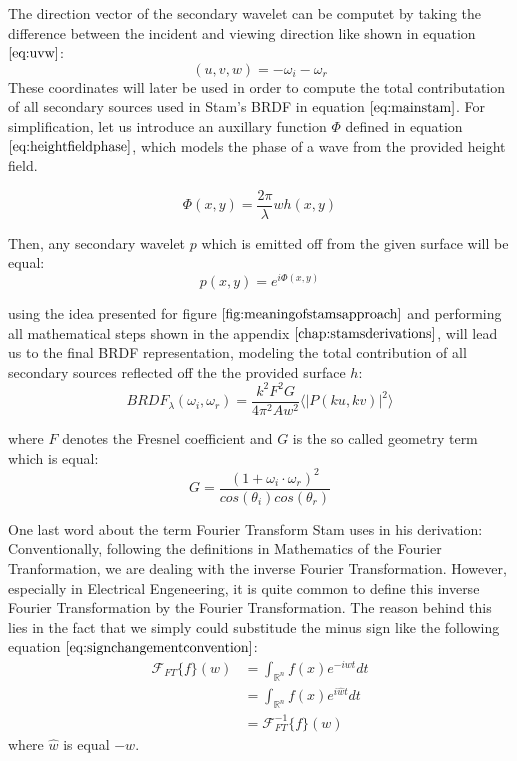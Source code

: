 The direction vector of the secondary wavelet can be computet by taking the difference between the incident and viewing direction like shown in equation $\ref{eq:uvw}$:
\begin{equation}
  (u,v,w) = -\omega_i - \omega_r 
\label{eq:uvw}
\end{equation}
These coordinates will later be used in order to compute the total contributation of all secondary sources used in Stam's BRDF in equation $\ref{eq:mainstam}$. For simplification, let us introduce an auxillary function $\Phi$ defined in equation $\ref{eq:heightfieldphase}$, which models the phase of a wave from the provided height field.

\begin{equation}
  \Phi(x,y) = \frac{2 \pi}{\lambda} w h(x,y) 
\label{eq:heightfieldphase}
\end{equation}

Then, any secondary wavelet $p$ which is emitted off from the given surface will be equal:
\begin{equation}
  p(x,y) = e^{i\Phi(x,y)} 
\label{eq:px}
\end{equation}

using the idea presented for figure $\ref{fig:meaningofstamsapproach}$ and performing all mathematical steps shown in the appendix $\ref{chap:stamsderivations}$, will lead us to the final BRDF representation, modeling the total contribution of all secondary sources reflected off the the provided surface $h$:
\begin{equation} 
  BRDF_{\lambda}(\omega_i, \omega_r) = \frac{k^2 F^2 G}{4\pi^2 A w^2} \langle \left|P(ku, kv)\right|^2\rangle
\label{eq:mainstam}
\end{equation}

where $F$ denotes the Fresnel coefficient and $G$ is the so called geometry term which is equal: 
\begin{equation}
  G =\frac{(1 + \omega_i \cdot \omega_r)^2}{cos(\theta_i)cos(\theta_r)}
\label{eq:geometricterm}
\end{equation}

One last word about the term Fourier Transform Stam uses in his derivation: Conventionally, following the definitions in Mathematics of the Fourier Tranformation, we are dealing with the inverse Fourier Transformation. However, especially in Electrical Engeneering, it is quite common to define this inverse Fourier Transformation by the Fourier Transformation. The reason behind this lies in the fact that we simply could substitude the minus sign like the following equation $\ref{eq:signchangementconvention}$:
\begin{align}
\mathcal{F}_{FT}\{f\}(w) 
& = \int_{\mathds{R}^n} f(x)e^{-iwt} dt \nonumber\\
& = \int_{\mathds{R}^n} f(x)e^{i\hat{w}t} dt \nonumber\\
& = \mathcal{F}^{-1}_{FT}\{f\}(w)
\label{eq:signchangementconvention}
\end{align} 
where $\hat{w}$ is equal $-w$. \\

